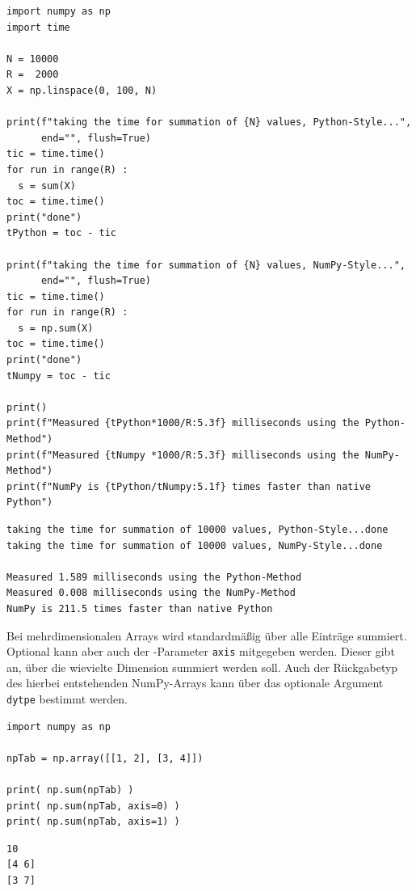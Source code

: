 \begin{codebox}
\begin{verbatim}
import numpy as np
import time

N = 10000
R =  2000
X = np.linspace(0, 100, N)

print(f"taking the time for summation of {N} values, Python-Style...",
      end="", flush=True)
tic = time.time()
for run in range(R) :
  s = sum(X)
toc = time.time()
print("done")
tPython = toc - tic

print(f"taking the time for summation of {N} values, NumPy-Style...",
      end="", flush=True)
tic = time.time()
for run in range(R) :
  s = np.sum(X)
toc = time.time()
print("done")
tNumpy = toc - tic

print()
print(f"Measured {tPython*1000/R:5.3f} milliseconds using the Python-Method")
print(f"Measured {tNumpy *1000/R:5.3f} milliseconds using the NumPy-Method")
print(f"NumPy is {tPython/tNumpy:5.1f} times faster than native Python")
\end{verbatim}
\end{codebox}
%
\begin{cmdbox}
\begin{verbatim}
taking the time for summation of 10000 values, Python-Style...done
taking the time for summation of 10000 values, NumPy-Style...done

Measured 1.589 milliseconds using the Python-Method
Measured 0.008 milliseconds using the NumPy-Method
NumPy is 211.5 times faster than native Python
\end{verbatim}
\end{cmdbox}

Bei mehrdimensionalen Arrays wird standardmäßig über alle Einträge summiert. Optional kann aber auch der -Parameter \texttt{axis} mitgegeben werden. Dieser gibt an, über die wievielte Dimension summiert werden soll. Auch der Rückgabetyp des hierbei entstehenden NumPy-Arrays kann über das optionale Argument \texttt{dytpe} bestimmt werden.

\begin{tcbraster}[raster columns=2,
                  raster equal height,
                  nobeforeafter,
                  raster column skip=0.5cm]
\begin{codebox}
\begin{verbatim}
import numpy as np

npTab = np.array([[1, 2], [3, 4]])

print( np.sum(npTab) )
print( np.sum(npTab, axis=0) )
print( np.sum(npTab, axis=1) )
\end{verbatim}
\end{codebox}
%
\begin{cmdbox}
\begin{verbatim}
10
[4 6]
[3 7]
\end{verbatim}
\end{cmdbox}
\end{tcbraster}

